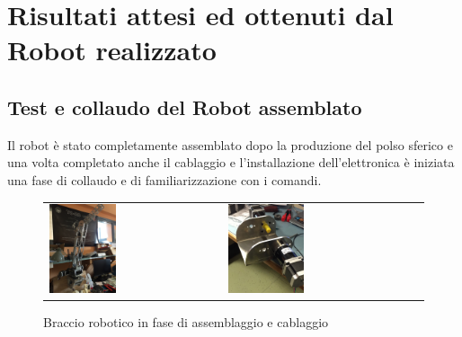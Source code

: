 \documentclass[%
corpo=11pt,
twoside,
 stile=classica,
oldstyle,
greek,%
]{toptesi}
\begin{document}
\chapter{Risultati attesi ed ottenuti dal Robot realizzato}
	\section{Test e collaudo del Robot assemblato}
	Il robot è stato completamente assemblato dopo la produzione del polso sferico e una volta completato anche il cablaggio e l'installazione dell'elettronica è iniziata una fase di collaudo e di familiarizzazione con i comandi. 
	\begin{figure}
		\centering
		\begin{tabular}{ll}
		\includegraphics[width=0.4\textwidth]{image/armfoto.jpg}
		&
		\includegraphics[width=0.4\textwidth]{image/baseass.jpg}
		\end{tabular}
		\caption{Braccio robotico in fase di assemblaggio e cablaggio}
		\label{fig:ass1}
	\end{figure}
\end{document}
